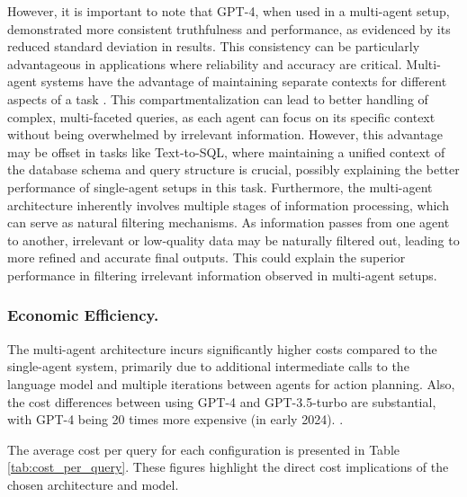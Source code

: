                 However, it is important to note that GPT-4, when used in a multi-agent setup, demonstrated more consistent truthfulness and performance, as evidenced by its reduced standard deviation in results. 
                This consistency can be particularly advantageous in applications where reliability and accuracy are critical. 
                Multi-agent systems have the advantage of maintaining separate contexts for different aspects of a task \citep{Langchain2025}. 
                This compartmentalization can lead to better handling of complex, multi-faceted queries, as each agent can focus on its specific context without being overwhelmed by irrelevant information. However, this advantage may be offset in tasks like Text-to-SQL, where maintaining a unified context of the database schema and query structure is crucial, possibly explaining the better performance of single-agent setups in this task.
                Furthermore, the multi-agent architecture inherently involves multiple stages of information processing, which can serve as natural filtering mechanisms.
                As information passes from one agent to another, irrelevant or low-quality data may be naturally filtered out, leading to more refined and accurate final outputs. 
                This could explain the superior performance in filtering irrelevant information observed in multi-agent setups.
            
            
            \subsubsection{Economic Efficiency.} 
            
                The multi-agent architecture incurs significantly higher costs compared to the single-agent system, primarily due to additional intermediate calls to the language model and multiple iterations between agents for action planning. 
                Also, the cost differences between using GPT-4 and GPT-3.5-turbo are substantial, with GPT-4 being 20 times more expensive (in early 2024).
                .

                The average cost per query for each configuration is presented in Table \ref{tab:cost_per_query}. These figures highlight the direct cost implications of the chosen architecture and model.
                

